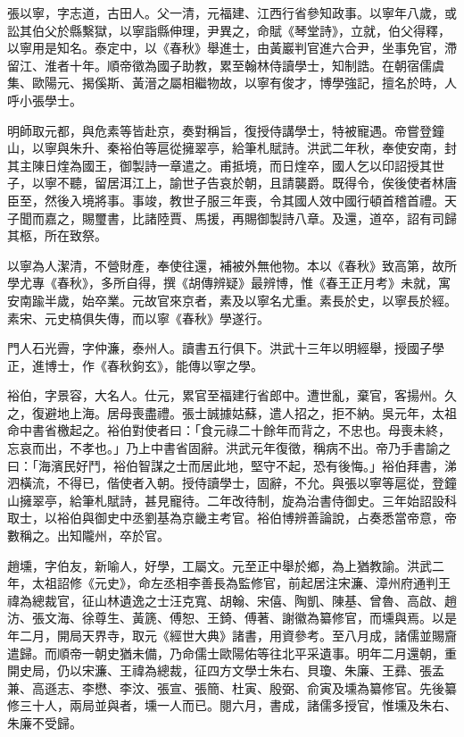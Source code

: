 \begin{pinyinscope}
張以寧，字志道，古田人。父一清，元福建、江西行省參知政事。以寧年八歲，或訟其伯父於縣繫獄，以寧詣縣伸理，尹異之，命賦《琴堂詩》，立就，伯父得釋，以寧用是知名。泰定中，以《春秋》舉進士，由黃巖判官進六合尹，坐事免官，滯留江、淮者十年。順帝徵為國子助教，累至翰林侍讀學士，知制誥。在朝宿儒虞集、歐陽元、揭傒斯、黃溍之屬相繼物故，以寧有俊才，博學強記，擅名於時，人呼小張學士。

明師取元都，與危素等皆赴京，奏對稱旨，復授侍講學士，特被寵遇。帝嘗登鐘山，以寧與朱升、秦裕伯等扈從擁翠亭，給筆札賦詩。洪武二年秋，奉使安南，封其主陳日煃為國王，御製詩一章遣之。甫抵境，而日煃卒，國人乞以印詔授其世子，以寧不聽，留居洱江上，諭世子告哀於朝，且請襲爵。既得令，俟後使者林唐臣至，然後入境將事。事竣，教世子服三年喪，令其國人效中國行頓首稽首禮。天子聞而嘉之，賜璽書，比諸陸賈、馬援，再賜御製詩八章。及還，道卒，詔有司歸其柩，所在致祭。

以寧為人潔清，不營財產，奉使往還，補被外無他物。本以《春秋》致高第，故所學尤專《春秋》，多所自得，撰《胡傳辨疑》最辨博，惟《春王正月考》未就，寓安南踰半歲，始卒業。元故官來京者，素及以寧名尤重。素長於史，以寧長於經。素宋、元史槁俱失傳，而以寧《春秋》學遂行。

門人石光霽，字仲濂，泰州人。讀書五行俱下。洪武十三年以明經舉，授國子學正，進博士，作《春秋鉤玄》，能傳以寧之學。

裕伯，字景容，大名人。仕元，累官至福建行省郎中。遭世亂，棄官，客揚州。久之，復避地上海。居母喪盡禮。張士誠據姑蘇，遣人招之，拒不納。吳元年，太祖命中書省檄起之。裕伯對使者曰：「食元祿二十餘年而背之，不忠也。母喪未終，忘哀而出，不孝也。」乃上中書省固辭。洪武元年復徵，稱病不出。帝乃手書諭之曰：「海濱民好鬥，裕伯智謀之士而居此地，堅守不起，恐有後悔。」裕伯拜書，涕泗橫流，不得已，偕使者入朝。授侍讀學士，固辭，不允。與張以寧等扈從，登鐘山擁翠亭，給筆札賦詩，甚見寵待。二年改待制，旋為治書侍御史。三年始詔設科取士，以裕伯與御史中丞劉基為京畿主考官。裕伯博辨善論說，占奏悉當帝意，帝數稱之。出知隴州，卒於官。

趙壎，字伯友，新喻人，好學，工屬文。元至正中舉於鄉，為上猶教諭。洪武二年，太祖詔修《元史》，命左丞相李善長為監修官，前起居注宋濂、漳州府通判王禕為總裁官，征山林遺逸之士汪克寬、胡翰、宋僖、陶凱、陳基、曾魯、高啟、趙汸、張文海、徐尊生、黃篪、傅恕、王錡、傅著、謝徽為纂修官，而壎與焉。以是年二月，開局天界寺，取元《經世大典》諸書，用資參考。至八月成，諸儒並賜齎遣歸。而順帝一朝史猶未備，乃命儒士歐陽佑等往北平采遺事。明年二月還朝，重開史局，仍以宋濂、王禕為總裁，征四方文學士朱右、貝瓊、朱廉、王彞、張孟兼、高遜志、李懋、李汶、張宣、張簡、杜寅、殷弼、俞寅及壎為纂修官。先後纂修三十人，兩局並與者，壎一人而已。閱六月，書成，諸儒多授官，惟壎及朱右、朱廉不受歸。


\end{pinyinscope}

